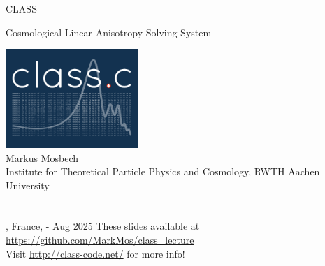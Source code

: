 
\begin{frame}

\begin{block}{
\begin{center}\Large CLASS\end{center}}
\begin{center}\small Cosmological Linear Anisotropy Solving System \end{center}
\end{block}

\scriptsize

\begin{center}
	\includegraphics[width=5cm,angle=0]{Figures/Logo1b_blue.pdf}\\
	Markus Mosbech\\
	Institute for Theoretical Particle Physics and Cosmology, RWTH Aachen University\\
	\mbox{}\\
	\mbox{}\\
	\location, France, \ecolefromdate{}-\ecoletodate{} Aug 2025
	\vfill
	These slides available at \url{https://github.com/MarkMos/class_lecture}\\
	Visit \url{http://class-code.net/} for more info!
\end{center}

\end{frame}
